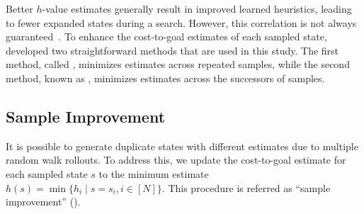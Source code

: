 \documentclass[ppgc,diss,english]{iiufrgs}
\begin{document}
Better $h$-value estimates generally result in improved learned heuristics, leading to fewer expanded states during a search. However, this correlation is not always guaranteed~\cite{Holte/2010}. To enhance the cost-to-goal estimates of each sampled state,~\citet{Bettker.etal/2022} developed two straightforward methods that are used in this study. The first method, called \sai, minimizes estimates across repeated samples, while the second method, known as \sui, minimizes estimates across the successors of samples.


\subsection{Sample Improvement}
\label{sec:sample-sai}
It is possible to generate duplicate states with different estimates due to multiple random walk rollouts. To address this, we update the cost-to-goal estimate for each sampled state $s$ to the minimum estimate $h(s) = \min\{h_i \mid s=s_i, i\in[N]\}$.
This procedure is referred as ``sample improvement'' (\sai).
\end{document}
